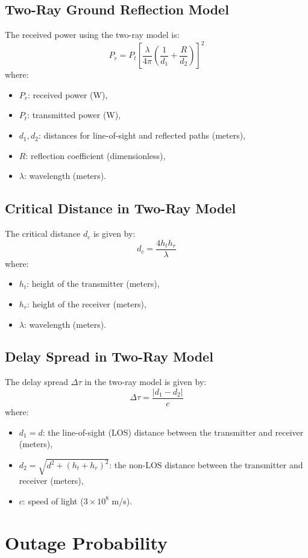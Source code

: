\documentclass[a4paper,12pt]{book}
\begin{document}
	\subsection{Two-Ray Ground Reflection Model}
	The received power using the two-ray model is:
	\[
	P_r = P_t \left[ \frac{\lambda}{4 \pi} \left( \frac{1}{d_1} + \frac{R}{d_2} \right) \right]^2
	\]
	where:
	\begin{itemize}
		\item \( P_r \): received power (W),
		\item \( P_t \): transmitted power (W),
		\item \( d_1, d_2 \): distances for line-of-sight and reflected paths (meters),
		\item \( R \): reflection coefficient (dimensionless),
		\item \( \lambda \): wavelength (meters).
	\end{itemize}
	
	\subsection{Critical Distance in Two-Ray Model}
	The critical distance \( d_c \) is given by:
	\[
	d_c = \frac{4 h_t h_r}{\lambda}
	\]
	where:
	\begin{itemize}
		\item \( h_t \): height of the transmitter (meters),
		\item \( h_r \): height of the receiver (meters),
		\item \( \lambda \): wavelength (meters).
	\end{itemize}
	
	\subsection{Delay Spread in Two-Ray Model}
	The delay spread \( \Delta \tau \) in the two-ray model is given by:
	\[
	\Delta \tau = \frac{|d_1 - d_2|}{c}
	\]
	where:
	\begin{itemize}
		\item \( d_1 = d \): the line-of-sight (LOS) distance between the transmitter and receiver (meters),
		\item \( d_2 = \sqrt{d^2 + (h_t + h_r)^2} \): the non-LOS distance between the transmitter and receiver (meters),
		\item \( c \): speed of light (\(3 \times 10^8\) m/s).
	\end{itemize}
	
	\section{Outage Probability}
	
\end{document}

